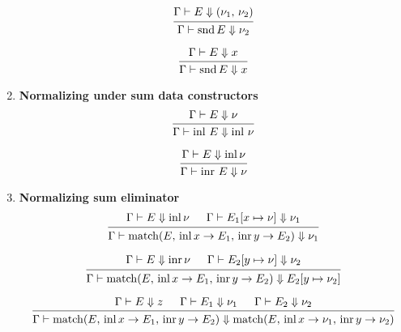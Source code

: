 \documentclass{article}
\begin{document}
\begin{enumerate}
  \[
    \begin{prooftree}
      \hypo{\Gamma \vdash E \Downarrow (\nu_1, \, \nu_2)}
      \infer1{\Gamma \vdash \snd E \Downarrow \nu_2}
    \end{prooftree}
  \]

  \[
   \begin{prooftree}
     \hypo{\Gamma \vdash E \Downarrow x}
     \infer1{\Gamma \vdash \snd E \Downarrow x}
   \end{prooftree}
  \]


  \item \textbf{Normalizing under sum data constructors}
  \[
    \begin{prooftree}
      \hypo{\Gamma \vdash E \Downarrow \nu}
      \infer1{\Gamma \vdash \inl \, E \Downarrow \inl \, \nu}
    \end{prooftree}  
  \]

  \[
    \begin{prooftree}
     \hypo{\Gamma \vdash E \Downarrow \inl \nu}
     \infer1{\Gamma \vdash \inr \, E \Downarrow \nu}
    \end{prooftree}  
  \]

  \item \textbf{Normalizing sum eliminator}
  \[
    \begin{prooftree}
      \hypo{\Gamma \vdash E \Downarrow \inl \nu}
      \hypo{\Gamma \vdash E_1[x \mapsto \nu] \Downarrow \nu_1}
      \infer2{\Gamma \vdash 
        \match(E, \, \inl x \rightarrow E_1, \, \inr y \rightarrow E_2)
        \Downarrow \nu_1}
    \end{prooftree}  
  \]

  \[
   \begin{prooftree}
     \hypo{\Gamma \vdash E \Downarrow \inr \nu}
     \hypo{\Gamma \vdash E_2[y \mapsto \nu] \Downarrow \nu_2}
     \infer2{\Gamma \vdash 
       \match(E, \, \inl x \rightarrow E_1, \, \inr y \rightarrow E_2)
       \Downarrow E_2[y \mapsto \nu_2]}
   \end{prooftree}  
  \]

  \[
   \begin{prooftree}
    \hypo{\Gamma \vdash E \Downarrow z}
      \hypo{\Gamma \vdash E_1 \Downarrow \nu_1}
      \hypo{\Gamma \vdash E_2 \Downarrow \nu_2}
      \infer3{\Gamma \vdash \match(E, \, \inl x \rightarrow E_1, \, \inr y \rightarrow E_2) 
               \Downarrow
               \match(E, \, \inl x \rightarrow \nu_1, \, \inr y \rightarrow \nu_2) 
               }
   \end{prooftree}  
  \]

\end{enumerate}
\end{document}
